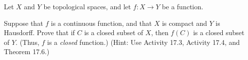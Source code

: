 \begin{comment}

\ExerciseSolution

	\ba
	\item First, $0 \in (-1,1)$. If $n \in \Z$ is not zero, then $n \in (-|n|+1, |n|+1)$. 
	
	Now suppose that $B_1$ and $B_2$ are basis sets and $n \in B_1 \cap B_2$. As basis sets, we know that $B_1 = (-k,k)$ and $B_2 = (-m,m)$ for some $k, mm \in \Z^+$. Without loss of generality, assume that $k \leq m$. Then $B_1 \subseteq B_2$ and $n \in B_1 = B_1 \cap B_2$. 
So $\B$ is a basis for a topology on $\Z$.	

	\item Let $\{O_{\alpha}\}_{\alpha \in I}$ for $\alpha$ in some indexing set $I$ be an open cover of $(2,2)$. Each $O_{\alpha}$ is a union of basis sets, so the open cover $\{O_{\alpha}\}_{\alpha \in I}$ also has the form $\{(-n,n)\}_{n \in J}$ for some subset $J$ of $\Z^+$. Since the sets $(-n,n)$ for $n \in J$ cover $(-2,2)$, there is an integer $m \in J$ such that $m > 2$. Thus, $\{(-m,m)\}$ is a finite subcover of $(-2,2)$ in $\{(-n,n)\}_{n \in J}$. We conclude that $(-2,2)$ is a compact subset of $\Z$. 
		
	\item We will show that the subsets of $\Z$ that are compact are finite subsets. It suffices to show that no infinite subset of $\Z$ is compact. Let $A$ be an infinite subset of $\Z$ and let $\{O_{\alpha}\}_{\alpha \in I}$ for $\alpha$ in some indexing set $I$ be an open cover of $A$. Each $O_{\alpha}$ is a union of basis sets, so the open cover $\{O_{\alpha}\}_{\alpha \in I}$ also has the form $\{(-n,n)\}_{n \in J}$ for some subset $J$ of $\Z^+$. Suppose there is a finite subcover $\{(-n,n)\}_{n \in K}$ of $A$ in $\{(-n,n)\}_{n \in J}$. Let $m = \max\{n \mid n \in K\}$. Then $(-n,n) \subseteq (-m,m)$ for every $n \in K$. But $(-m,m)$ is a finite set of integers, and so can't cover the infinite set $A$. We conclude that $A$ is not compact. 
	
	\ea

\end{comment}

\item Let $X$ and $Y$ be topological spaces, and let $f: X \to Y$ be a function.

\ba

\item Suppose that $f$ is a continuous function, and that $X$ is compact and $Y$ is Hausdorff. Prove that if $C$ is a closed subset of $X$, then $f(C)$ is a closed subset of $Y$. (Thus, $f$ is a \emph{closed} function.) (Hint: Use Activity 17.3, Activity 17.4, and Theorem 17.6.)

